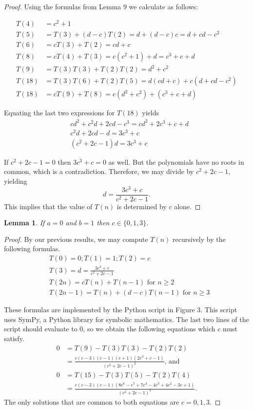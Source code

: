 \documentclass[11pt,fleqn]{amsart}
\newtheorem{lemma}{Lemma}
\begin{document}
\begin{proof}
Using the formulas from Lemma 9 we calculate as follows:

\begin{align*}
T(4) &= c^2 + 1 \\
T(5) &= T(3) + (d-c) T(2) = d + (d - c) c = d + cd - c^2 \\
T(6) &= cT(3) + T(2) = cd + c \\
T(8) &= cT(4) + T(3) = c(c^2+1) + d = c^3 + c + d \\
T(9) &= T(3) T(3) + T(2) T(2) = d^2 + c^2 \\
T(18) &= T(3) T(6) + T(2) T(5) = d(cd + c) + c(d + cd - c^2) \\
T(18) &= cT(9) + T(8) = c(d^2 + c^2) + (c^3 + c + d)
\end{align*}

Equating the last two expressions for $T(18)$ yields
\begin{align*}
& cd^2 + c^2d + 2cd - c^3 = cd^2 + 2c^3 + c + d \\
& c^2d + 2cd - d = 3c^3 + c \\
& (c^2 + 2c - 1)d = 3c^3 + c
\end{align*}

If $c^2 + 2c - 1 = 0$ then $3c^3 + c = 0$ as well. But the polynomials have no roots in common,
which is a contradiction. Therefore, we may divide by $c^2 + 2c - 1$, yielding
$$d = \frac{3c^3 + c}{c^2+2c-1}.$$
This implies that the value of $T(n)$ is determined by $c$ alone.
\end{proof}

\begin{lemma}
If $a=0$ and $b=1$ then $c \in \{0, 1, 3\}$.
\end{lemma}

\begin{proof}
By our previous results, we
may compute $T(n)$ recursively by the following formulas.
\begin{align*}
& T(0) = 0; T(1) = 1; T(2) = c \\
& T(3) = d = \frac{3c^3+c}{c^2+2c-1} \\
& T(2n) = cT(n) + T(n-1) \text{ for } n \ge 2 \\
& T(2n-1) = T(n) + (d-c) T(n-1) \text{ for } n \ge 3
\end{align*}

These formulas are implemented by the Python script in Figure 3.
This script uses SymPy\cite{SymPy}, a Python library for symbolic mathematics.
The last two lines of the script should evaluate to 0, so we obtain the 
following equations which $c$ must satisfy.
\begin{align*}
 0 &= T(9) - T(3) T(3) - T(2) T(2) \\
    &= \frac{c(c - 3)(c - 1)(c + 1)(2c^3 + c - 1)}{(c^2 + 2c - 1)^2} \text{, and}\\
0  &= T(15) - T(3) T(5) - T(2) T(4) \\
    &= \frac{c(c - 3)(c - 1)(8c^6 - c^5 + 7c^4 - 4c^3 + 4c^2 - 3c + 1)}{(c^2+2c-1)^3}.
\end{align*}
The only solutions that are common to both equations are $c = 0, 1, 3$.
\end{proof}
\end{document}
